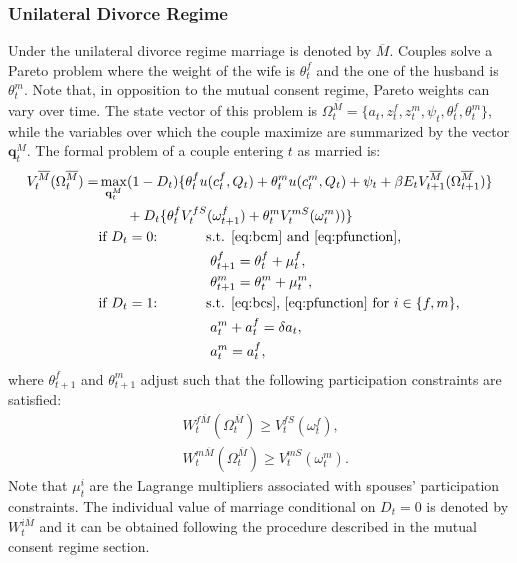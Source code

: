 \documentclass[12pt]{article}
\numberwithin{table}{section}
\begin{document}
\subsubsection*{Unilateral Divorce Regime}
Under the unilateral divorce regime marriage is denoted by $\overline{M}$. Couples solve a Pareto problem where the weight of the wife is $\theta^f_t$ and the one of the husband is $\theta^m_t$. Note that, in opposition to the mutual consent regime, Pareto weights can vary over time. The state vector of this problem is $\Omega^{\overline{M}}_t=\{a_t,z^f_t,z^m_t,\psi_t,\theta^f_t,\theta^m_t\}$, while the variables over which the couple maximize are summarized by the vector $\mathbf{q}^M_t$. The formal problem of a couple entering $t$ as married is:
\begin{equation}\label{eq:v_uni}
\begin{split}
V_t^{\overline{M}}(\Omega^{\overline{M}}_t)=&\max_{\mathbf{q}^M_t} (1-D_t)\{\theta^f_{t} u(c^f_t,Q_t)+\theta^m_{t} u(c^m_t,Q_t)+\psi_t+\beta E_t V^{\overline{M}}_{t+1}(\Omega^{\overline{M}}_{t+1})\}\\ &\quad\quad+D_t \{\theta^f_{t}V^{fS}_{t}(\omega^{f}_{t+1})+\theta^m_{t} V^{mS}_{t}(\omega^{m}_{t}))\}
\\ &\text{if $D_t=0$:}\hspace{35pt}\text{s.t. \eqref{eq:bcm} and \eqref{eq:pfunction},}\\ &\hspace{80pt}
\theta^f_{t+1}=\theta^f_{t}+\mu^f_t,\\ &\hspace{80pt}
\theta^m_{t+1}=\theta^m_{t}+\mu^m_t,
\\ &\text{if $D_t=1$:}\hspace{35pt}\text{s.t. \eqref{eq:bcs}, \eqref{eq:pfunction} for $i\in\{f,m\}$,}\\ &
\hspace{80pt}a_t^m+a_t^f=\delta a_t,	\\ &
\hspace{80pt}a_t^m=a_t^f,
\end{split}
\end{equation}
where $\theta^f_{t+1}$ and $\theta^m_{t+1}$ adjust such that the following participation constraints are satisfied:
\begin{equation}\label{eq:p_cons_mar}
\begin{split}
&
W^{f\overline{M}}_{t}(\Omega^{\overline{M}}_{t})\geq V_{t}^{fS}(\omega^f_{t}),\\ &
W^{m\overline{M}}_{t}(\Omega^{\overline{M}}_{t})\geq V_{t}^{mS}(\omega^m_{t}). 
\end{split}
\end{equation}
Note that $\mu^i_t$ are the Lagrange multipliers associated with spouses' participation constraints. The individual value of marriage conditional on $D_t=0$ is denoted by $W_{t}^{i\overline{M}}$ and it can be obtained following the procedure described in the mutual consent regime section. 
\end{document}
